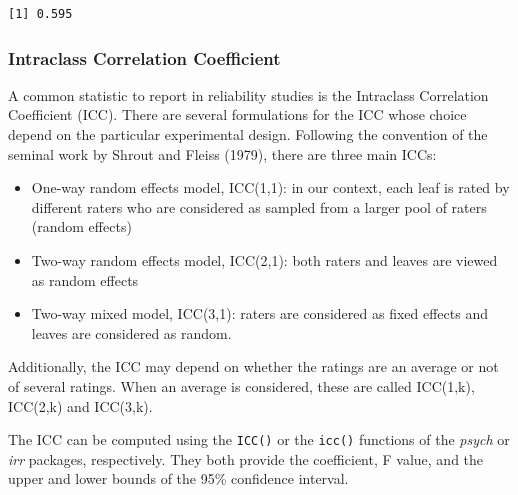 \documentclass[
  letterpaper,
]{book}
\newenvironment{Shaded}{\begin{snugshade}}{\end{snugshade}}
\newcommand{\CommentTok}[1]{\textcolor[rgb]{0.37,0.37,0.37}{#1}}
\newcommand{\DecValTok}[1]{\textcolor[rgb]{0.68,0.00,0.00}{#1}}
\newcommand{\FunctionTok}[1]{\textcolor[rgb]{0.28,0.35,0.67}{#1}}
\newcommand{\NormalTok}[1]{\textcolor[rgb]{0.00,0.23,0.31}{#1}}
\newcommand{\OtherTok}[1]{\textcolor[rgb]{0.00,0.23,0.31}{#1}}
\newcommand{\SpecialCharTok}[1]{\textcolor[rgb]{0.37,0.37,0.37}{#1}}
\begin{document}
\begin{verbatim}
[1] 0.595
\end{verbatim}

\hypertarget{intraclass-correlation-coefficient}{%
\subsubsection{Intraclass Correlation
Coefficient}\label{intraclass-correlation-coefficient}}

A common statistic to report in reliability studies is the Intraclass
Correlation Coefficient (ICC). There are several formulations for the
ICC whose choice depend on the particular experimental design. Following
the convention of the seminal work by Shrout and Fleiss (1979), there
are three main ICCs:

\begin{itemize}
\item
  One-way random effects model, ICC(1,1): in our context, each leaf is
  rated by different raters who are considered as sampled from a larger
  pool of raters (random effects)
\item
  Two-way random effects model, ICC(2,1): both raters and leaves are
  viewed as random effects
\item
  Two-way mixed model, ICC(3,1): raters are considered as fixed effects
  and leaves are considered as random.
\end{itemize}

Additionally, the ICC may depend on whether the ratings are an average
or not of several ratings. When an average is considered, these are
called ICC(1,k), ICC(2,k) and ICC(3,k).

The ICC can be computed using the \texttt{ICC()} or the \texttt{icc()}
functions of the \emph{psych} or \emph{irr} packages, respectively. They
both provide the coefficient, F value, and the upper and lower bounds of
the 95\% confidence interval.

\begin{Shaded}
\end{Shaded}
\end{document}
